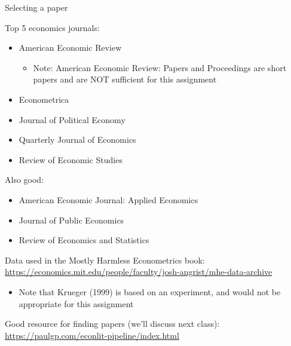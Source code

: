 \documentclass[compress, 8pt]{beamer}
\begin{document}
\begin{frame}{Selecting a paper}

Top 5 economics journals:
\begin{itemize}
    \item American Economic Review
    \begin{itemize}
        \item Note: American Economic Review: Papers and Proceedings are short papers and are NOT sufficient for this assignment
    \end{itemize}
    \item Econometrica
    \item Journal of Political Economy
    \item Quarterly Journal of Economics
    \item Review of Economic Studies
\end{itemize}
Also good:
\begin{itemize}
    \item American Economic Journal: Applied Economics
    \item Journal of Public Economics
    \item Review of Economics and Statistics
\end{itemize}


Data used in the Mostly Harmless Econometrics book: \url{https://economics.mit.edu/people/faculty/josh-angrist/mhe-data-archive}
\begin{itemize}
    \item Note that Krueger (1999) is based on an experiment, and would not be appropriate for this assignment
\end{itemize}
Good resource for finding papers (we'll discuss next class): \url{https://paulgp.com/econlit-pipeline/index.html}

\end{frame}
\end{document}
